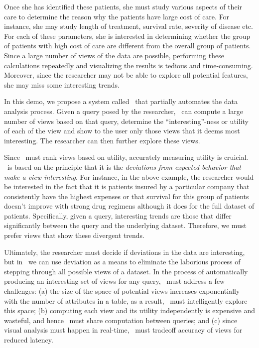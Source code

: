 Once she has identified these patients, she must study various aspects of their
care to determine the reason why the patients have large cost of care. For
instance, she may study length of treatment, survival rate, severity of disease
etc. For each of these parameters, she is interested in determining whether the
group of patients with high cost of care are different from the overall group of
patients. Since a large number of views of the data are possible, performing
these calculations repeatedly and visualizing the results is tedious and
time-consuming. Moreover, since the researcher may not be able to explore all
potential features, she may miss some interesting trends.

In this demo, we propose a system called \SeeDB\ that partially automates the
data analysis process. Given a query posed by the researcher, \SeeDB\ can
compute a large number of views based on that query, determine the
``interesting''-ness or utility of each of the view and show to the user only
those views that it deems most interesting. The researcher can then further
explore these views. 

Since \SeeDB\ must rank views based on utility, accurately measuring utility is
cruicial. \SeeDB\ is based on the principle that it is the {\it deviations from
expected behavior that make a view interesting}. For instance, in the above
example, the researcher would be interested in the fact that it is patients
insured by a particular company that consistently have the highest expenses or
that survival for this group of patients doesn't improve with strong drug
regimens although it does for the full dataset of patients. Specifically, given
a query, interesting trends are those that differ significantly between the
query and the underlying dataset. Therefore, we must prefer views that show
these divergent trends.

Ultimately, the researcher must decide if deviations in the data are
interesting, but in \SeeDB\ we can use deviation as a means to eliminate the
laborious process of stepping through all possible views of a dataset.
In the process of automatically producing an interesting set of views for any
query, \SeeDB\ must address a few challenges: (a) the size of
the space of potential views increases exponentially with the number of
attributes in a table, as a result, \SeeDB\ must intelligently explore this
space; (b) computing each view and its utility independently is expensive and
wasteful, and hence \SeeDB\ must share computation between queries; and (c)
since visual analysis must happen in real-time, \SeeDB\ must tradeoff accuracy
of views for reduced latency.

